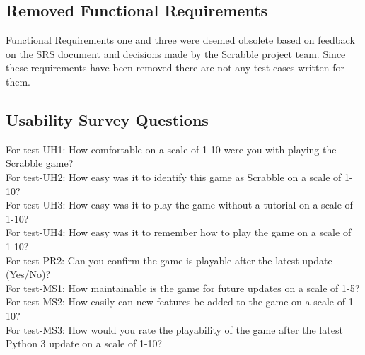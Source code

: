 \documentclass[12pt, titlepage]{article}
\begin{document}
\subsection{Removed Functional Requirements}
Functional Requirements one and three were deemed obsolete based on feedback on the SRS document and decisions made by the Scrabble project team. Since these requirements have been removed there are not any test cases written for them.\\
\subsection{Usability Survey Questions}
For test-UH1: How comfortable on a scale of 1-10 were you with playing the Scrabble game?\\
For test-UH2: How easy was it to identify this game as Scrabble on a scale of 1-10?\\
For test-UH3: How easy was it to play the game without a tutorial on a scale of 1-10?\\
For test-UH4: How easy was it to remember how to play the game on a scale of 1-10?\\
For test-PR2: Can you confirm the game is playable after the latest update (Yes/No)?\\
For test-MS1: How maintainable is the game for future updates on a scale of 1-5?\\
For test-MS2: How easily can new features be added to the game on a scale of 1-10?\\
For test-MS3: How would you rate the playability of the game after the latest Python 3 update on a scale of 1-10?\\
\end{document}
